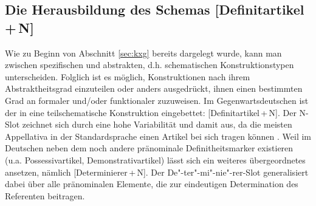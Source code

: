 \subsection{Die Herausbildung des Schemas [Definitartikel\,+\,N]}\label{sec:schema}

Wie zu Beginn von Abschnitt \ref{sec:kxg} bereits dargelegt wurde, kann man zwischen spezifischen  und abstrakten, d.h. schematischen Konstruktionstypen  unterscheiden. Folglich ist es möglich, Konstruktionen nach ihrem Abstraktheitsgrad einzuteilen oder anders ausgedrückt, ihnen einen bestimmten Grad an formaler und\slash oder funktionaler  zuzuweisen. Im Gegenwartsdeutschen ist der  in eine teilschematische Konstruktion   eingebettet: [Definitartikel\,+\,N]. Der N-Slot zeichnet sich durch eine hohe Variabilität und damit  aus, da die meisten Appellativa  in der Standardsprache einen Artikel bei sich tragen können \parencite[zu den Ausnahmen s.][]{DAvis2013}.
Weil im Deutschen neben dem  noch andere pränominale Definitheitsmarker  existieren (u.a. Possessivartikel, Demonstrativartikel) lässt sich ein weiteres übergeordnetes  ansetzen, nämlich [Determinierer\,+\,N]. Der De"-ter"-mi"-nie"-rer-Slot generalisiert dabei über alle pränominalen Elemente, die zur eindeutigen Determination des Referenten beitragen. 


